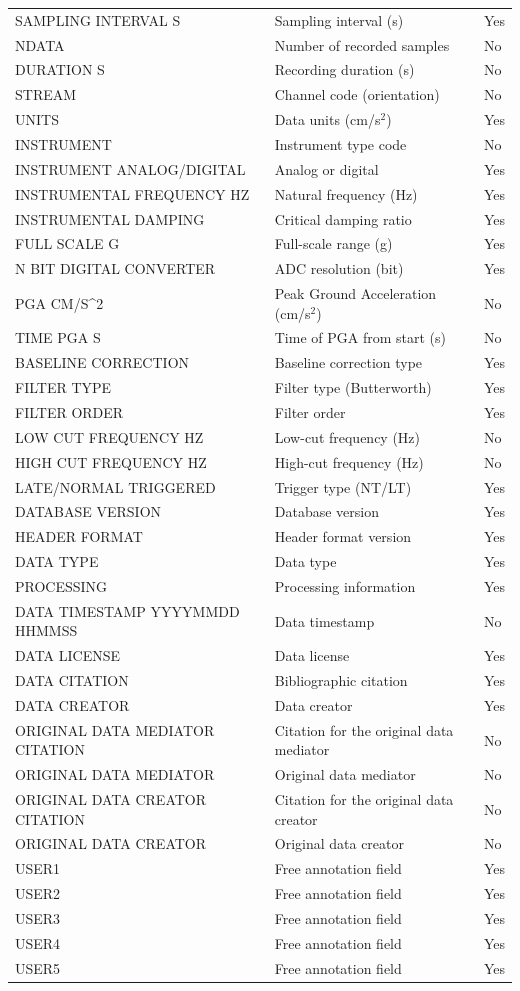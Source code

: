 \begin{longtable}{
  >{\raggedright\arraybackslash}p{4cm}  >{\raggedright\arraybackslash}p{8cm}  >{\centering\arraybackslash}p{2cm}
}
SAMPLING INTERVAL S & Sampling interval (s) & Yes \\
NDATA & Number of recorded samples & No \\
DURATION S & Recording duration (s) & No \\
STREAM & Channel code (orientation) & No \\
UNITS & Data units (cm/s$^2$) & Yes \\
INSTRUMENT & Instrument type code & No \\
INSTRUMENT ANALOG/DIGITAL & Analog or digital & Yes \\
INSTRUMENTAL FREQUENCY HZ & Natural frequency (Hz) & Yes \\
INSTRUMENTAL DAMPING & Critical damping ratio & Yes \\
FULL SCALE G & Full-scale range (g) & Yes \\
N BIT DIGITAL CONVERTER & ADC resolution (bit) & Yes \\
PGA CM/S^2 & Peak Ground Acceleration (cm/s$^2$) & No \\
TIME PGA S & Time of PGA from start (s) & No \\
BASELINE CORRECTION & Baseline correction type & Yes \\
FILTER TYPE & Filter type (Butterworth) & Yes \\
FILTER ORDER & Filter order & Yes \\
LOW CUT FREQUENCY HZ & Low-cut frequency (Hz) & No \\
HIGH CUT FREQUENCY HZ & High-cut frequency (Hz) & No \\
LATE/NORMAL TRIGGERED & Trigger type (NT/LT) & Yes \\
DATABASE VERSION & Database version & Yes \\
HEADER FORMAT & Header format version & Yes \\
DATA TYPE & Data type & Yes \\
PROCESSING & Processing information & Yes \\
DATA TIMESTAMP YYYYMMDD HHMMSS & Data timestamp & No \\
DATA LICENSE & Data license & Yes \\
DATA CITATION & Bibliographic citation & Yes \\
DATA CREATOR & Data creator & Yes \\
ORIGINAL DATA MEDIATOR CITATION & Citation for the original data mediator & No \\
ORIGINAL DATA MEDIATOR & Original data mediator & No \\
ORIGINAL DATA CREATOR CITATION & Citation for the original data creator & No \\
ORIGINAL DATA CREATOR & Original data creator & No \\
USER1 & Free annotation field & Yes \\
USER2 & Free annotation field & Yes \\
USER3 & Free annotation field & Yes \\
USER4 & Free annotation field & Yes \\
USER5 & Free annotation field & Yes \\
\end{longtable}